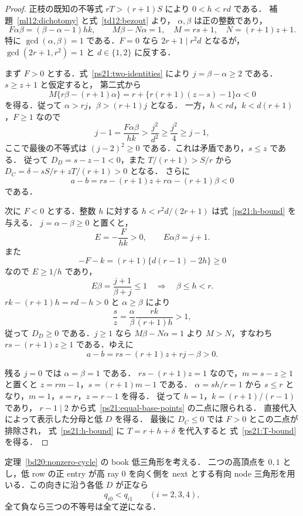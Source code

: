 \begin{proof}
正枝の既知の不等式 $rT>(r+1)S$ により $0<h<rd$ である．
補題~\ref{ml12:dichotomy} と式~\eqref{td12:bezout} より，
$\alpha,\beta$ は正の整数であり，
\begin{equation}\label{ps21:two-identities}
 F\alpha\beta=(\beta-\alpha-1)hk,\qquad
 M\beta-N\alpha=1,
 \quad M=rs+1,
 \quad N=(r+1)z+1.
\end{equation}
特に $\gcd(\alpha,\beta)=1$ である．$F=0$ なら
$2r+1\mid r^2d$ となるが，$\gcd(2r+1,r^2)=1$ と $d\in\{1,2\}$ に反する．

まず $F>0$ とする．式~\eqref{ps21:two-identities} により
$j=\beta-\alpha\ge2$ である．$s\ge z+1$ と仮定すると，
第二式から
\[
 M\{r\beta-(r+1)\alpha\}
 =r+\{r(r+1)(z-s)-1\}\alpha<0
\]
を得る．従って $\alpha>rj$，$\beta>(r+1)j$ となる．
一方，$h<rd$，$k<d(r+1)$，$F\ge1$ なので
\[
 j-1=\frac{F\alpha\beta}{hk}
 >\frac{j^2}{d^2}\ge\frac{j^2}{4}\ge j-1,
\]
ここで最後の不等式は $(j-2)^2\ge0$ である．これは矛盾であり，$s\le z$ である．
従って $D_D=s-z-1<0$，また
$T/(r+1)>S/r$ から $D_C=\delta-sS/r+zT/(r+1)>0$ となる．
さらに
\[
 a-b=rs-(r+1)z+r\alpha-(r+1)\beta<0
\]
である．

次に $F<0$ とする．整数 $h$ に対する
$h<r^2d/(2r+1)$ は式~\eqref{ps21:h-bound} を与える．
$j=\alpha-\beta\ge0$ と置くと，
\[
 E=-\frac{F}{hk}>0,\qquad E\alpha\beta=j+1.
\]
また
\[
 -F-k=(r+1)\{d(r-1)-2h\}\ge0
\]
なので $E\ge1/h$ であり，
\[
 E\beta=\frac{j+1}{\beta+j}\le1
 \quad\Longrightarrow\quad \beta\le h<r.
\]
$rk-(r+1)h=rd-h>0$ と $\alpha\ge\beta$ により
\[
 \frac sz=\frac\alpha\beta\frac{rk}{(r+1)h}>1,
\]
従って $D_D\ge0$ である．$j\ge1$ なら
$M\beta-N\alpha=1$ より $M>N$，すなわち
$rs-(r+1)z\ge1$ である．ゆえに
\[
 a-b=rs-(r+1)z+rj-\beta>0.
\]

残る $j=0$ では $\alpha=\beta=1$ である．
$rs-(r+1)z=1$ なので，$m=s-z\ge1$ と置くと
$z=rm-1$，$s=(r+1)m-1$ である．
$\alpha=sh/r=1$ から $s\le r$ となり，$m=1$，$s=r$，$z=r-1$ を得る．
従って $h=1$，$k=(r+1)/(r-1)$ であり，
$r-1\mid2$ から式~\eqref{ps21:equal-base-points} の二点に限られる．
直接代入によって表示した分母と低 $D$ を得る．
最後に $D_C\le0$ では $F>0$ とこの二点が排除され，
式~\eqref{ps21:h-bound} に $T=r+h+\delta$ を代入すると
式~\eqref{ps21:T-bound} を得る．
\end{proof}

\begin{corollary}
\label{ps21:book-denominator-order}
定理~\ref{bd20:nonzero-cycle} の book 低三角形を考える．
二つの高頂点を $0,1$ とし，低 row の正 entry が高 ray $0$ を向く側を
next とする有向 node 三角形を用いる．この向きに沿う各低 $D$ が正なら
\[
 q_{i0}<q_{i1}\qquad(i=2,3,4),
\]
全て負なら三つの不等号は全て逆になる．
\end{corollary}

